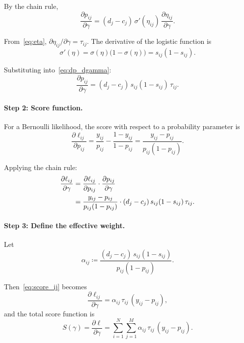 \documentclass[11pt,a4paper]{article}
\theoremstyle{definition}
\begin{document}
By the chain rule,
\begin{equation}\label{eq:dp_dgamma}
  \frac{\partial p_{ij}}{\partial\gamma}
  = (d_j - c_j)\,\sigma'(\eta_{ij})\,\frac{\partial\eta_{ij}}{\partial\gamma}.
\end{equation}

From~\eqref{eq:eta}, $\partial\eta_{ij}/\partial\gamma = \tau_{ij}$.
The derivative of the logistic function is
\begin{equation}\label{eq:sig_deriv}
  \sigma'(\eta) = \sigma(\eta)\bigl(1-\sigma(\eta)\bigr) = s_{ij}(1-s_{ij}).
\end{equation}

Substituting into~\eqref{eq:dp_dgamma}:
\begin{equation}\label{eq:dp_final}
  \frac{\partial p_{ij}}{\partial\gamma}
  = (d_j - c_j)\,s_{ij}(1-s_{ij})\,\tau_{ij}.
\end{equation}

\paragraph{Step 2: Score function.}

For a Bernoulli likelihood, the score with respect to a probability parameter is
\begin{equation}\label{eq:bern_score}
  \frac{\partial\ell_{ij}}{\partial p_{ij}}
  = \frac{y_{ij}}{p_{ij}} - \frac{1-y_{ij}}{1-p_{ij}}
  = \frac{y_{ij} - p_{ij}}{p_{ij}(1-p_{ij})}.
\end{equation}

Applying the chain rule:
\begin{align}
  \frac{\partial\ell_{ij}}{\partial\gamma}
  &= \frac{\partial\ell_{ij}}{\partial p_{ij}}\cdot\frac{\partial p_{ij}}{\partial\gamma}
  \notag\\
  &= \frac{y_{ij} - p_{ij}}{p_{ij}(1-p_{ij})}
     \cdot (d_j - c_j)\,s_{ij}(1-s_{ij})\,\tau_{ij}.
  \label{eq:score_ij}
\end{align}

\paragraph{Step 3: Define the effective weight.}
Let
\begin{equation}\label{eq:alpha}
  \alpha_{ij}
  \coloneqq \frac{(d_j - c_j)\,s_{ij}(1-s_{ij})}{p_{ij}(1-p_{ij})}.
\end{equation}

Then~\eqref{eq:score_ij} becomes
\begin{equation}\label{eq:score_ij_short}
  \frac{\partial\ell_{ij}}{\partial\gamma}
  = \alpha_{ij}\,\tau_{ij}\,(y_{ij} - p_{ij}),
\end{equation}
and the total score function is
\begin{equation}\label{eq:total_score}
  S(\gamma) = \frac{\partial\ell}{\partial\gamma}
  = \sum_{i=1}^{N}\sum_{j=1}^{M}
    \alpha_{ij}\,\tau_{ij}\,(y_{ij} - p_{ij}).
\end{equation}
\end{document}
